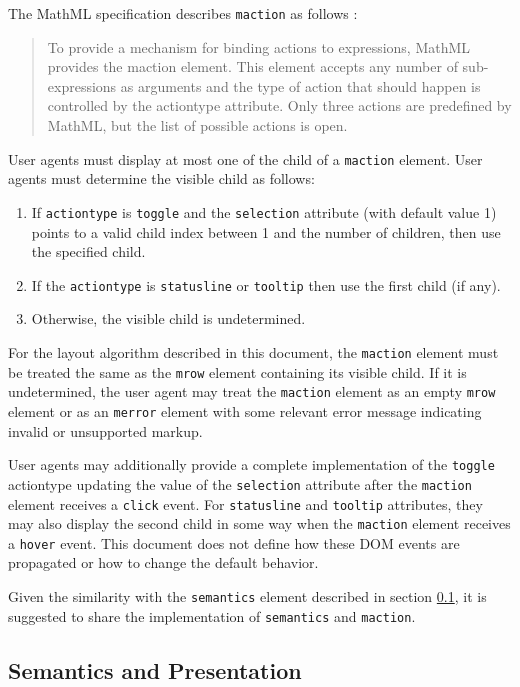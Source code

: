The MathML specification describes {\tt maction} as follows \cite{MathML3}:
%
\begin{quote}
To provide a mechanism for binding actions to expressions, MathML provides the
maction element. This element accepts any number of sub-expressions as
arguments and the type of action that should happen is controlled by the
actiontype attribute. Only three actions are predefined by MathML, but the list
of possible actions is open.
\end{quote}
%
User agents must display at most one of the child of a {\tt maction} element.
User agents must determine the visible child as follows:
\begin{enumerate}
\item If {\tt actiontype} is {\tt toggle} and the {\tt selection} attribute
  (with default value 1) points to a valid child index
  between 1 and the number of children, then use the specified child.
\item If the {\tt actiontype} is {\tt statusline} or {\tt tooltip} then
  use the first child (if any).
\item Otherwise, the visible child is undetermined.
\end{enumerate}

For the layout algorithm described in this document, the
{\tt maction} element must be treated the same as the {\tt mrow} element
containing its visible child. If it is undetermined,
the user agent may treat the {\tt maction} element as an
empty {\tt mrow} element or as an {\tt merror} element with some relevant error
message indicating invalid or unsupported markup.

User agents may additionally provide a complete implementation of the
{\tt toggle} actiontype updating the value of the {\tt selection} attribute
after the {\tt maction} element receives a {\tt click} event.
For {\tt statusline} and {\tt tooltip} attributes, they may also display the
second child in some way when the {\tt maction} element receives a {\tt hover}
event. This document does not define how these DOM events are propagated
or how to change the default behavior.

Given the similarity with the {\tt semantics} element
described in section \ref{semantics}, it is
suggested to share the implementation of {\tt semantics} and {\tt maction}.

\subsection{Semantics and Presentation}\label{semantics}

